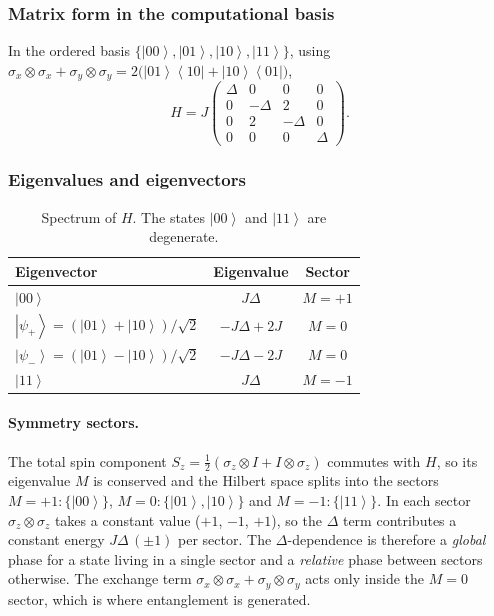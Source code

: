\documentclass[11pt,a4paper]{article}
\newcommand{\ket}[1]{\left|#1\right\rangle}
\newcommand{\bra}[1]{\left\langle #1\right|}
\begin{document}
\subsubsection{Matrix form in the computational basis}
In the ordered basis $\{\ket{00},\ket{01},\ket{10},\ket{11}\}$, using $\sigma_x\otimes\sigma_x+\sigma_y\otimes\sigma_y=2\bigl(\ket{01}\!\bra{10}+\ket{10}\!\bra{01}\bigr)$,
\begin{equation}
  H=J\begin{pmatrix}
  \Delta&0&0&0\\
  0&-\Delta&2&0\\
  0&2&-\Delta&0\\
  0&0&0&\Delta
  \end{pmatrix}.
\end{equation}

\subsubsection{Eigenvalues and eigenvectors}
\begin{table}[htbp]
  \centering
  \begin{tabular}{@{}lcc@{}}
    \toprule
    Eigenvector & Eigenvalue & Sector\\
    \midrule
    $\ket{00}$ & $J\Delta$ & $M=+1$\\
    $\ket{\psi_+}=(\ket{01}+\ket{10})/\sqrt2$ & $-J\Delta+2J$ & $M=0$\\
    $\ket{\psi_-}=(\ket{01}-\ket{10})/\sqrt2$ & $-J\Delta-2J$ & $M=0$\\
    $\ket{11}$ & $J\Delta$ & $M=-1$\\
    \bottomrule
  \end{tabular}
  \caption{Spectrum of $H$. The states $\ket{00}$ and $\ket{11}$ are degenerate.}
\end{table}

\paragraph{Symmetry sectors.}
The total spin component $S_z=\tfrac12(\sigma_z\otimes I+I\otimes\sigma_z)$ commutes with $H$, so its eigenvalue $M$ is conserved and the Hilbert space splits into the sectors $M=+1:\{\ket{00}\}$, $M=0:\{\ket{01},\ket{10}\}$ and $M=-1:\{\ket{11}\}$. In each sector $\sigma_z\otimes\sigma_z$ takes a constant value ($+1$, $-1$, $+1$), so the $\Delta$ term contributes a constant energy $J\Delta\,(\pm1)$ per sector. The $\Delta$-dependence is therefore a \emph{global} phase for a state living in a single sector and a \emph{relative} phase between sectors otherwise. The exchange term $\sigma_x\otimes\sigma_x+\sigma_y\otimes\sigma_y$ acts only inside the $M=0$ sector, which is where entanglement is generated.
\end{document}
